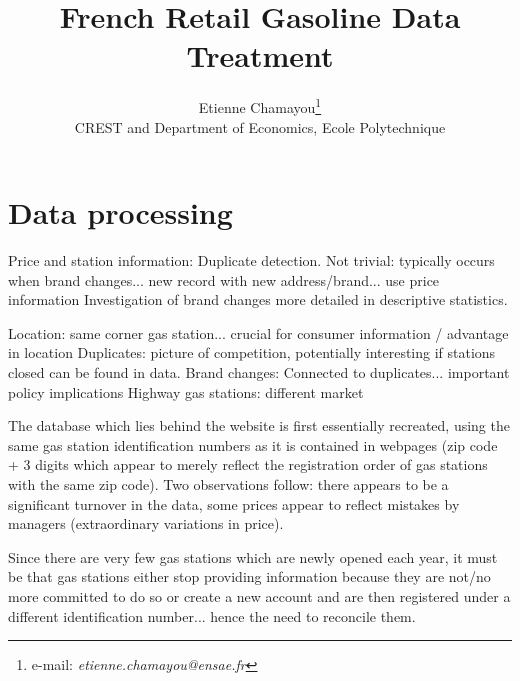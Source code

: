 \documentclass[11pt]{article}
\begin{document}
\title{French Retail Gasoline Data Treatment}
\author{Etienne Chamayou\thanks{e-mail:
\textit{etienne.chamayou@ensae.fr}}\medskip\\{\normalsize CREST and Department of Economics, Ecole Polytechnique }}
\maketitle

\sloppy%

\onehalfspacing


\strut


\strut


\pagebreak%
\doublespacing

\section{Data processing}
\setcounter{page}{1}

Price and station information: Duplicate detection. Not trivial: typically occurs when brand changes... new record with new address/brand... use price information
Investigation of brand changes more detailed in descriptive statistics.

Location: same corner gas station... crucial for consumer information / advantage in location
Duplicates: picture of competition, potentially interesting if stations closed can be found in data.
Brand changes: Connected to duplicates... important policy implications
Highway gas stations: different market

The database which lies behind the website is first essentially recreated, using the same gas station identification numbers as it is contained in webpages (zip code + 3 digits which appear to merely reflect the registration order of gas stations with the same zip code). Two observations follow: there appears to be a significant turnover in the data, some prices appear to reflect mistakes by managers (extraordinary variations in price).

Since there are very few gas stations which are newly opened each year, it must be that gas stations either stop providing information because they are not/no more committed to do so or create a new account and are then registered under a different identification number... hence the need to reconcile them.
\end{document}
